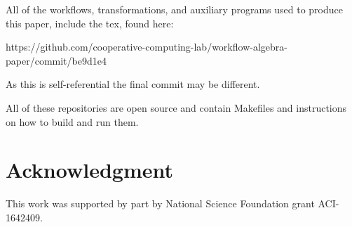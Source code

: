 \documentclass[conference]{IEEEtran}
\begin{document}
All of the workflows, transformations, and auxiliary
programs used to produce this paper, include the tex, found here:
\begin{framed}
\noindent
{\small https://github.com/cooperative-computing-lab/workflow-algebra-paper/commit/be9d1e4}
\end{framed}
\noindent
As this is self-referential the final commit may be different.


All of these repositories are open source and contain Makefiles
and instructions on how to build and run them.



\section*{Acknowledgment}

This work was supported by part by National Science Foundation grant ACI-1642409.




\end{document}
